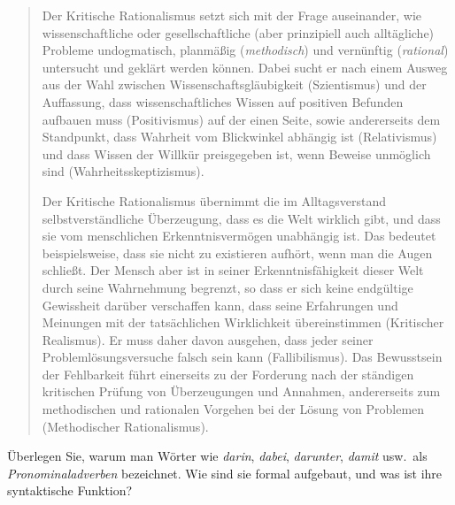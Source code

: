 \begin{quote}\small
  Der Kritische Rationalismus setzt sich mit der Frage auseinander, wie wissenschaftliche oder gesellschaftliche (aber prinzipiell auch alltägliche) Probleme undogmatisch, planmäßig (\textit{methodisch}) und vernünftig (\textit{rational}) untersucht und geklärt werden können. Dabei sucht er nach einem Ausweg aus der Wahl zwischen Wissenschaftsgläubigkeit (Szientismus) und der Auffassung, dass wissenschaftliches Wissen auf positiven Befunden aufbauen muss (Positivismus) auf der einen Seite, sowie andererseits dem Standpunkt, dass Wahrheit vom Blickwinkel abhängig ist (Relativismus) und dass Wissen der Willkür preisgegeben ist, wenn Beweise unmöglich sind (Wahrheitsskeptizismus).

Der Kritische Rationalismus übernimmt die im Alltagsverstand selbstverständliche Überzeugung, dass es die Welt wirklich gibt, und dass sie vom menschlichen Erkenntnis­vermögen unabhängig ist. Das bedeutet beispielsweise, dass sie nicht zu existieren aufhört, wenn man die Augen schließt. Der Mensch aber ist in seiner Erkenntnisfähigkeit dieser Welt durch seine Wahrnehmung begrenzt, so dass er sich keine endgültige Gewissheit darüber verschaffen kann, dass seine Erfahrungen und Meinungen mit der tatsächlichen Wirklichkeit übereinstimmen (Kritischer Realismus). Er muss daher davon ausgehen, dass jeder seiner Problemlösungsversuche falsch sein kann (Fallibilismus). Das Bewusstsein der Fehlbarkeit führt einerseits zu der Forderung nach der ständigen kritischen Prüfung von Überzeugungen und Annahmen, andererseits zum methodischen und rationalen Vorgehen bei der Lösung von Problemen (Methodischer Rationalismus).
\end{quote}

\Uebung[\tristar] \label{u57} Überlegen Sie, warum man Wörter wie \textit{darin}, \textit{dabei}, \textit{darunter}, \textit{damit} usw.\ als \textit{Pronominaladverben} bezeichnet.
Wie sind sie formal aufgebaut, und was ist ihre syntaktische Funktion?
